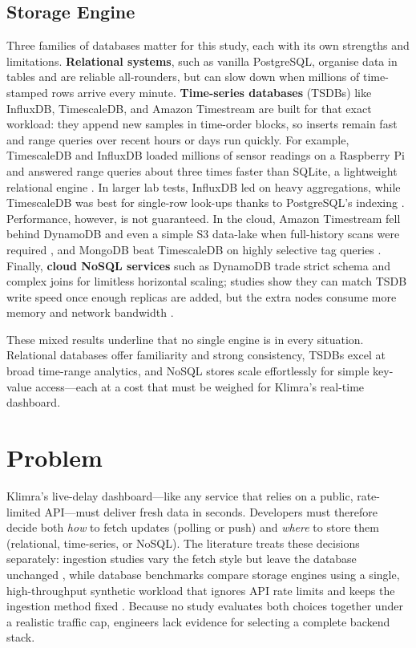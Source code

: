 \documentclass[nomenclature, english, biblatex]{kththesis}
\numberwithin{listing}{chapter}
\begin{document}
\subsection{Storage Engine}
Three families of databases matter for this study, each with its own strengths and limitations.
\textbf{Relational systems}, such as vanilla PostgreSQL, organise data in tables and are reliable all-rounders, but can slow down when millions of time-stamped rows arrive every minute.
\textbf{Time-series databases} (\glspl{TSDB}) like InfluxDB, TimescaleDB, and Amazon Timestream are built for that exact workload: they append new samples in time-order blocks, so inserts remain fast and range queries over recent hours or days run quickly. For example, TimescaleDB and InfluxDB loaded millions of sensor readings on a Raspberry Pi and answered range queries about three times faster than SQLite, a lightweight relational engine \cite{Grzesik2020EdgeIoTBenchmark}. In larger lab tests, InfluxDB led on heavy aggregations, while TimescaleDB was best for single-row look-ups thanks to PostgreSQL's indexing \cite{Daqouri2023TimeseriesVsSQL,Heldt2021SciTS}. Performance, however, is not guaranteed. In the cloud, Amazon Timestream fell behind DynamoDB and even a simple S3 data-lake when full-history scans were required \cite{Johansson2022AWSCloudData}, and MongoDB beat TimescaleDB on highly selective tag queries \cite{Mohamed2024DBMSComparison}.
Finally, \textbf{cloud NoSQL services} such as DynamoDB trade strict schema and complex joins for limitless horizontal scaling; studies show they can match \gls{TSDB} write speed once enough replicas are added, but the extra nodes consume more memory and network bandwidth \cite{Zhang2023EdgeTSDB,Vergara2021PerformanceTSDB}.

These mixed results underline that no single engine is  in every situation. Relational databases offer familiarity and strong consistency, \glspl{TSDB} excel at broad time-range analytics, and NoSQL stores scale effortlessly for simple key-value access—each at a cost that must be weighed for Klimra's real-time dashboard.





\section{Problem}
\label{sec:problem}

Klimra's live-delay dashboard—like any service that relies on a public, rate-limited API—must deliver fresh data in seconds. Developers must therefore decide both \textit{how} to fetch updates (polling or push) and \textit{where} to store them (relational, time-series, or NoSQL). The literature treats these decisions separately: ingestion studies vary the fetch style but leave the database unchanged \cite{Trindade2021EDAImpact,Lewis2020PowerOfEDA}, while database benchmarks compare storage engines using a single, high-throughput synthetic workload that ignores \gls{API} rate limits and keeps the ingestion method fixed \cite{Heldt2021SciTS,Grzesik2020EdgeIoTBenchmark}. Because no study evaluates both choices together under a realistic traffic cap, engineers lack evidence for selecting a complete backend stack.
\end{document}
